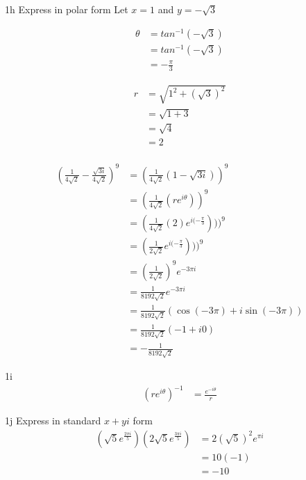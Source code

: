 \begin{question}{1h} Express in polar form
Let $x=1$ and $y=-\sqrt{3}$

\begin{align*}
\theta
 &= tan^{-1}(-\sqrt{3}) \\
 &= tan^{-1}(-\sqrt{3}) \\
 &= -\frac{\pi}{3}
\end{align*}

\begin{align*}
r 
&= \sqrt{1^2 + (\sqrt{3})^2} \\
&= \sqrt{1 + 3} \\
&= \sqrt{4} \\
&= 2 \\
\end{align*}

\begin{align*}
(\frac{1}{4\sqrt{2}} - \frac{\sqrt{3i}}{4\sqrt{2}})^{9}
 &= (\frac{1}{4\sqrt{2}}(1-\sqrt{3i}))^{9} \\
 &= (\frac{1}{4\sqrt{2}}(re^{i\theta}))^{9} \\
 &= (\frac{1}{4\sqrt{2}}(2)e^{i(-\frac{\pi}{3}})))^{9} \\
 &= (\frac{1}{2\sqrt{2}}e^{i(-\frac{\pi}{3}})))^{9} \\
 &= (\frac{1}{2\sqrt{2}})^9   e^{-3\pi i} \\
 &= \frac{1}{8192\sqrt{2}}   e^{-3\pi i} \\
 &= \frac{1}{8192\sqrt{2}}   (\cos(-3\pi) +i\sin(-3\pi)) \\
 &= \frac{1}{8192\sqrt{2}}   (-1 +i0) \\
 &= -\frac{1}{8192\sqrt{2}}
\end{align*}
\end{question}


\begin{question}{1i}
\begin{align*}
(re^{i\theta})^{-1}
 &= \frac{e^{-i\theta}}{r}
\end{align*} 
\end{question}

\begin{question}{1j} Express in standard $x+yi$ form
\begin{align*}
(\sqrt{5}e^{\frac{2\pi i}{5}})(2\sqrt{5}e^{\frac{3\pi i}{5}})
 &= 2(\sqrt{5})^2e^{\pi i}\\ 
 &= 10(-1)\\ 
 &= -10 
\end{align*}
\end{question}

